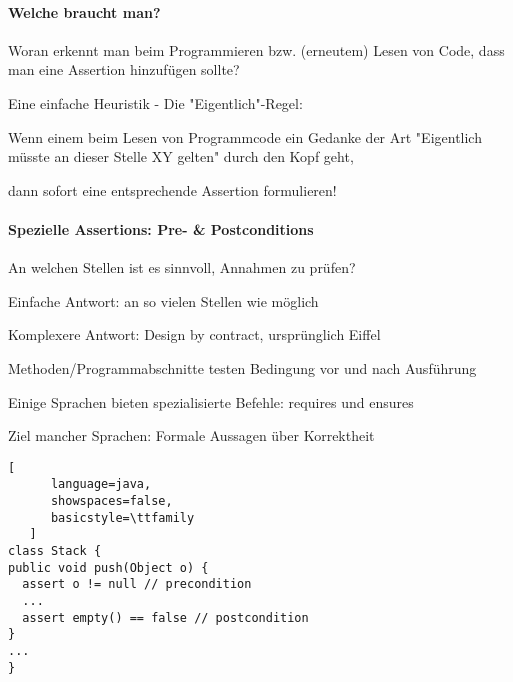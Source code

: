 \documentclass[10pt]{article}
\begin{document}
\paragraph{Welche braucht man?}
\begin{itemize*}
  \item Woran erkennt man beim Programmieren bzw. (erneutem) Lesen von Code, dass man eine Assertion hinzufügen sollte?
  \item Eine einfache Heuristik - Die "Eigentlich"-Regel:
  \begin{itemize*}
    \item Wenn einem beim Lesen von Programmcode ein Gedanke der Art "Eigentlich müsste an dieser Stelle XY gelten" durch den Kopf geht,
    \item dann sofort eine entsprechende Assertion formulieren!
  \end{itemize*}
\end{itemize*}

\paragraph{Spezielle Assertions: Pre- \& Postconditions}
\begin{itemize*}
  \item An welchen Stellen ist es sinnvoll, Annahmen zu prüfen?
  \item Einfache Antwort: an so vielen Stellen wie möglich
  \item Komplexere Antwort: Design by contract, ursprünglich Eiffel
  \item Methoden/Programmabschnitte testen Bedingung vor und nach Ausführung
  \item Einige Sprachen bieten spezialisierte Befehle: requires und ensures
  \item Ziel mancher Sprachen: Formale Aussagen über Korrektheit
\end{itemize*}

\begin{lstlisting}[
      language=java,
      showspaces=false,
      basicstyle=\ttfamily
   ]
class Stack {
public void push(Object o) {
  assert o != null // precondition
  ...
  assert empty() == false // postcondition
}
...
}
\end{lstlisting}
\end{document}
